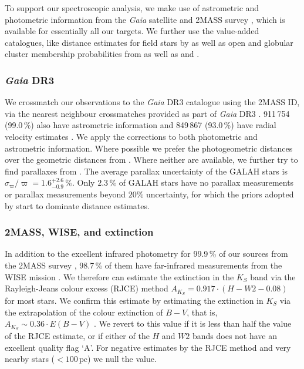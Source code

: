 \documentclass[
  journal=pasa,
  manuscript=research-paper, %
  year=2024,
  volume=37
]{cup-journal}
\newcommand{\Gaia}{\textit{Gaia}\xspace}
\begin{document}
To support our spectroscopic analysis, we make use of astrometric and photometric information from the \Gaia satellite \citep{Gaia-Collaboration2016} and 2MASS survey \citep{Skrutskie2006}, which is available for essentially all our targets. We further use the value-added catalogues, like distance estimates for field stars by \citet{BailerJones2021} as well as open and globular cluster membership probabilities from \citet{CantatGaudin2020} as well as \citet{Vasiliev2021} and \citet{Baumgardt2021}.

\subsubsection{\Gaia DR3}

We crossmatch our observations to the \Gaia DR3 catalogue \citep{Brown2021,GaiaDR3} using the 2MASS ID, via the nearest neighbour crossmatches provided as part of \Gaia DR3 \citep{Torra2021}. 
911\,754 (99.0\,\%) also have astrometric information \citep{Lindegren2021a} and 849\,867 (93.0\,\%) have radial velocity estimates \citep{Katz2023}. We apply the corrections to both photometric \citep{Riello2021} and astrometric \citep{Lindegren2021b} information. Where possible we prefer the photogeometric distances over the geometric distances from \citet{BailerJones2021}. Where neither are available, we further try to find parallaxes from \cite{vanLeeuwen2007}. The average parallax uncertainty of the GALAH stars is $\sigma_{\varpi} / \varpi = 1.6_{-0.9}^{+2.6}\,\mathrm{\%}$. Only $2.3\,\%$ of GALAH stars have no parallax measurements or parallax measurements beyond $20\%$ uncertainty, for which the priors adopted by \citet{BailerJones2021} start to dominate distance estimates.

\subsubsection{2MASS, WISE, and extinction}

In addition to the excellent infrared photometry for 99.9\,\% of our sources from the 2MASS survey \citep{Skrutskie2006}, 98.7\,\% of them have far-infrared measurements from the WISE mission \citep{Cutri2013}. We therefore can estimate the extinction in the $K_S$ band via the Rayleigh-Jeans colour excess (RJCE) method \citep{Majewski2011} $A_{K_S}  = 0.917 \cdot \left( H - W2 - 0.08 \right)$ for most stars. We confirm this estimate by estimating the extinction in $K_S$ via the extrapolation of the colour extinction of $B-V$, that is, $A_{K_S} \sim 0.36 \cdot E(B-V)$ \citep{Cardelli1989}. We revert to this value if it is less than half the value of the RJCE estimate, or if either of the $H$ and $W2$ bands does not have an excellent quality flag `A'. For negative estimates by the RJCE method and very nearby stars ($<100\,\mathrm{pc}$) we null the value.
\end{document}
